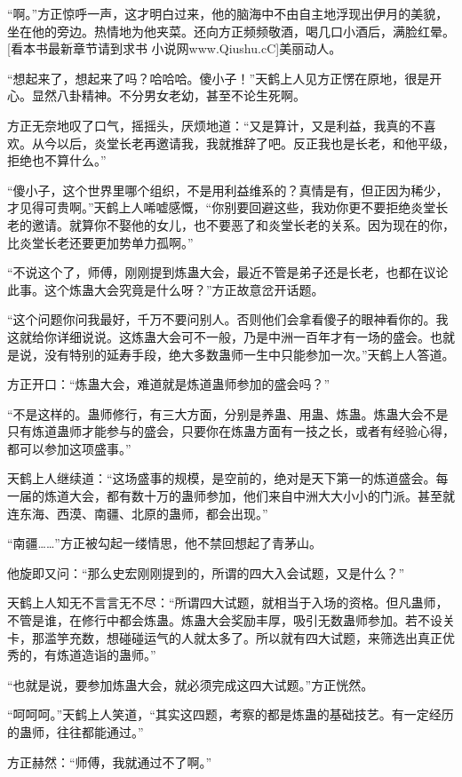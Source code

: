\begin{this_body}
“啊。”方正惊呼一声，这才明白过来，他的脑海中不由自主地浮现出伊月的美貌，坐在他的旁边。热情地为他夹菜。还向方正频频敬酒，喝几口小酒后，满脸红晕。[看本书最新章节请到求书 小说网www.Qiushu.cC]美丽动人。

“想起来了，想起来了吗？哈哈哈。傻小子！”天鹤上人见方正愣在原地，很是开心。显然八卦精神。不分男女老幼，甚至不论生死啊。

方正无奈地叹了口气，摇摇头，厌烦地道：“又是算计，又是利益，我真的不喜欢。从今以后，炎堂长老再邀请我，我就推辞了吧。反正我也是长老，和他平级，拒绝也不算什么。”

“傻小子，这个世界里哪个组织，不是用利益维系的？真情是有，但正因为稀少，才见得可贵啊。”天鹤上人唏嘘感慨，“你别要回避这些，我劝你更不要拒绝炎堂长老的邀请。就算你不娶他的女儿，也不要恶了和炎堂长老的关系。因为现在的你，比炎堂长老还要更加势单力孤啊。”

“不说这个了，师傅，刚刚提到炼蛊大会，最近不管是弟子还是长老，也都在议论此事。这个炼蛊大会究竟是什么呀？”方正故意岔开话题。

“这个问题你问我最好，千万不要问别人。否则他们会拿看傻子的眼神看你的。我这就给你详细说说。这炼蛊大会可不一般，乃是中洲一百年才有一场的盛会。也就是说，没有特别的延寿手段，绝大多数蛊师一生中只能参加一次。”天鹤上人答道。

方正开口：“炼蛊大会，难道就是炼道蛊师参加的盛会吗？”

“不是这样的。蛊师修行，有三大方面，分别是养蛊、用蛊、炼蛊。炼蛊大会不是只有炼道蛊师才能参与的盛会，只要你在炼蛊方面有一技之长，或者有经验心得，都可以参加这项盛事。”

天鹤上人继续道：“这场盛事的规模，是空前的，绝对是天下第一的炼道盛会。每一届的炼道大会，都有数十万的蛊师参加，他们来自中洲大大小小的门派。甚至就连东海、西漠、南疆、北原的蛊师，都会出现。”

“南疆……”方正被勾起一缕情思，他不禁回想起了青茅山。

他旋即又问：“那么史宏刚刚提到的，所谓的四大入会试题，又是什么？”

天鹤上人知无不言言无不尽：“所谓四大试题，就相当于入场的资格。但凡蛊师，不管是谁，在修行中都会炼蛊。炼蛊大会奖励丰厚，吸引无数蛊师参加。若不设关卡，那滥竽充数，想碰碰运气的人就太多了。所以就有四大试题，来筛选出真正优秀的，有炼道造诣的蛊师。”

“也就是说，要参加炼蛊大会，就必须完成这四大试题。”方正恍然。

“呵呵呵。”天鹤上人笑道，“其实这四题，考察的都是炼蛊的基础技艺。有一定经历的蛊师，往往都能通过。”

方正赫然：“师傅，我就通过不了啊。”


\end{this_body}
